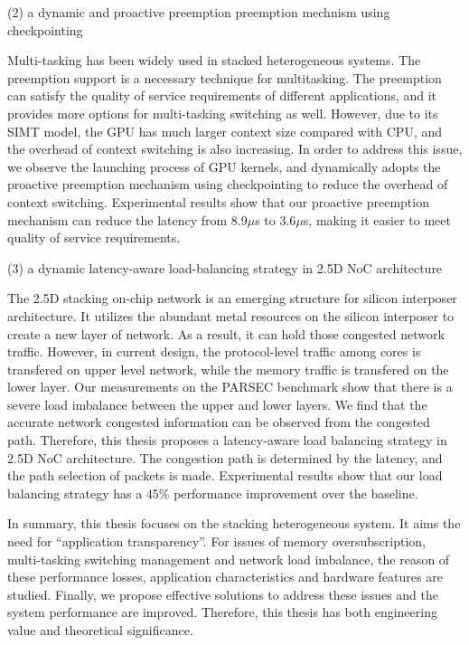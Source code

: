 \begin{eabstract}
(2) a dynamic and proactive preemption preemption mechnism using checkpointing

Multi-tasking has been widely used in stacked heterogeneous systems.
The preemption support is a necessary technique for multitasking.
The preemption can satisfy the quality of service requirements of different applications, and it provides more options for multi-tasking switching as well.
However, due to its SIMT model, the GPU has much larger context size compared with CPU, and the overhead of context switching is also increasing.
In order to address this issue, we observe the launching process of GPU kernels, and dynamically adopts the proactive preemption mechanism using checkpointing to reduce the overhead of context switching.
Experimental results show that our proactive preemption mechanism can reduce the latency from 8.9$\mu$s to 3.6$\mu$s, making it easier to meet quality of service requirements.

(3) a dynamic latency-aware load-balancing strategy in 2.5D NoC architecture

The 2.5D stacking on-chip network is an emerging structure for silicon interposer architecture. 
It utilizes the abundant metal resources on the silicon interposer to create a new layer of network.
As a result, it can hold those congested network traffic.
However, in current design, the protocol-level traffic among cores is transfered on upper level network, while the memory traffic is transfered on the lower layer.
Our measurements on the PARSEC benchmark show that there is a severe load imbalance between the upper and lower layers.
We find that the accurate network congested information can be observed from the congested path. 
Therefore, this thesis proposes a latency-aware load balancing strategy in 2.5D NoC architecture.
The congestion path is determined by the latency, and the path selection of packets is made.
Experimental results show that our load balancing strategy has a 45\% performance improvement over the baseline.

In summary, this thesis focuses on the stacking heterogeneous system. 
It aims the need for ``application transparency''.
For issues of memory oversubscription, multi-tasking switching management and network load imbalance, the reason of these performance losses, application characteristics and hardware features are studied.
Finally, we propose effective solutions to address these issues and the system performance are improved.
Therefore, this thesis has both engineering value and theoretical significance.

\end{eabstract}

